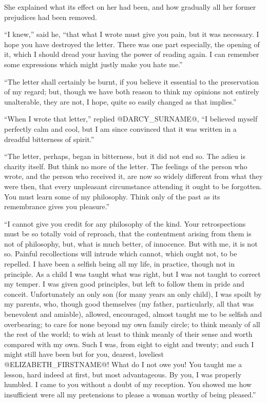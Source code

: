 She explained what its effect on her had been, and how gradually all her
former prejudices had been removed.

``I knew,'' said he, ``that what I wrote must give you pain, but it was
necessary. I hope you have destroyed the letter. There was one part
especially, the opening of it, which I should dread your having the
power of reading again. I can remember some expressions which might
justly make you hate me.''

``The letter shall certainly be burnt, if you believe it essential to the
preservation of my regard; but, though we have both reason to think my
opinions not entirely unalterable, they are not, I hope, quite so easily
changed as that implies.''

``When I wrote that letter,'' replied @DARCY_SURNAME@, ``I believed myself perfectly
calm and cool, but I am since convinced that it was written in a
dreadful bitterness of spirit.''

``The letter, perhaps, began in bitterness, but it did not end so. The
adieu is charity itself. But think no more of the letter. The feelings
of the person who wrote, and the person who received it, are now
so widely different from what they were then, that every unpleasant
circumstance attending it ought to be forgotten. You must learn some
of my philosophy. Think only of the past as its remembrance gives you
pleasure.''

``I cannot give you credit for any philosophy of the kind. Your
retrospections must be so totally void of reproach, that the contentment
arising from them is not of philosophy, but, what is much better, of
innocence. But with me, it is not so. Painful recollections will intrude
which cannot, which ought not, to be repelled. I have been a selfish
being all my life, in practice, though not in principle. As a child I
was taught what was right, but I was not taught to correct my temper. I
was given good principles, but left to follow them in pride and conceit.
Unfortunately an only son (for many years an only child), I was spoilt
by my parents, who, though good themselves (my father, particularly, all
that was benevolent and amiable), allowed, encouraged, almost taught
me to be selfish and overbearing; to care for none beyond my own family
circle; to think meanly of all the rest of the world; to wish at least
to think meanly of their sense and worth compared with my own. Such I
was, from eight to eight and twenty; and such I might still have been
but for you, dearest, loveliest @ELIZABETH_FIRSTNAME@! What do I not owe you! You
taught me a lesson, hard indeed at first, but most advantageous. By you,
I was properly humbled. I came to you without a doubt of my reception.
You showed me how insufficient were all my pretensions to please a woman
worthy of being pleased.''

